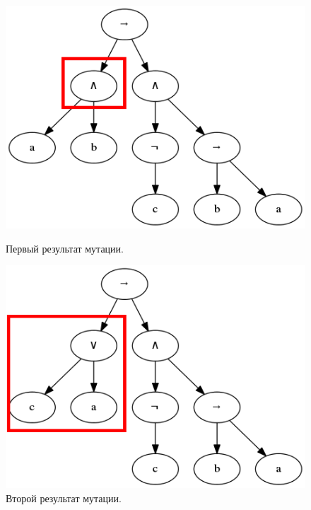 \documentclass[12pt,fleqn]{article}
\begin{document}
\begin{figure}[!h]%
  \centering
  \begin{minipage}{2in}%
    \centering
    \includegraphics[scale=0.3]{t6.png}
    \caption{Первый результат мутации.}
  \end{minipage}%
  \qquad
  \begin{minipage}{2in}%
    \centering
    \includegraphics[scale=0.3]{t7.png}
    \caption{Второй результат мутации.}
  \end{minipage}%
\end{figure}
\end{document}
